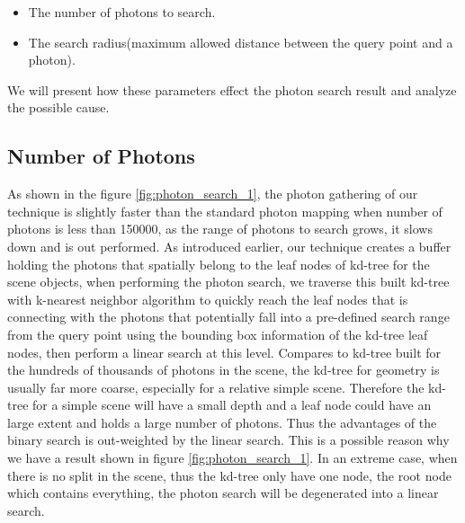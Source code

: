 \begin{itemize}

\item{The number of photons to search. }

\item{The search radius(maximum allowed distance between the query point and a photon). } 

\end{itemize} 

We will present how these parameters effect the photon search result and analyze the possible cause. 

\subsection{Number of Photons} 

As shown in the figure \ref{fig:photon_search_1}, the photon gathering of our technique is slightly faster than the standard photon mapping when number of photons is less than 150000, as the range of photons to search grows, it slows down and is out performed. As introduced earlier, our technique creates a buffer holding the photons that spatially belong to the leaf nodes of kd-tree for the scene objects, when performing the photon search, we traverse this built kd-tree with k-nearest neighbor algorithm to quickly reach the leaf nodes that is connecting with the photons that potentially fall into a pre-defined search range from the query point using the bounding box information of the kd-tree leaf nodes, then perform a linear search at this level. Compares to kd-tree built for the hundreds of thousands of photons in the scene, the kd-tree for geometry is usually far more coarse, especially for a relative simple scene. Therefore the kd-tree for a simple scene will have a small depth and a leaf node could have an large extent and holds a large number of photons. Thus the advantages of the binary search is out-weighted by the linear search. This is a possible reason why we have a result shown in figure \ref{fig:photon_search_1}. In an extreme case, when there is no split in the scene, thus the kd-tree only have one node, the root node which contains everything, the photon search will be degenerated into a linear search. 

